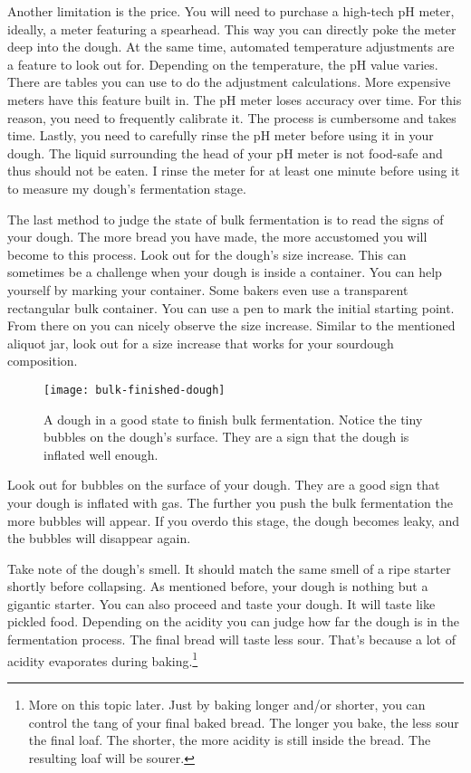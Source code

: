 Another limitation is the price. You will need to purchase
a high-tech pH meter, ideally, a meter featuring a spearhead.
This way you can directly poke the meter deep into the dough.
At the same time, automated temperature adjustments are a
feature to look out for. Depending on the temperature,
the pH value varies. There are tables you can use to
do the adjustment calculations. More expensive meters
have this feature built in. The pH meter loses accuracy
over time. For this reason, you need to frequently
calibrate it. The process is cumbersome and takes time.
Lastly, you need to carefully rinse the pH meter before
using it in your dough. The liquid surrounding the
head of your pH meter is not food-safe and thus should
not be eaten. I rinse the meter for at least one minute
before using it to measure my dough's fermentation stage.

The last method to judge the state of bulk fermentation
is to read the signs of your dough. The more bread you have
made, the more accustomed you will become to this process.
Look out for the dough's size increase. This can sometimes
be a challenge when your dough is inside a container.
You can help yourself by marking your container. Some bakers
even use a transparent rectangular bulk container. You
can use a pen to mark the initial starting point. From there
on you can nicely observe the size increase. Similar to the
mentioned aliquot jar, look out for a size increase that works
for your sourdough composition.

\begin{figure}[!htb]
  \texttt{[image: bulk-finished-dough]}
  \caption{A dough in a good state to finish bulk fermentation. Notice
  the tiny bubbles on the dough's surface. They are a sign that the dough
  is inflated well enough.}
\end{figure}

Look out for bubbles on the surface of your dough. They
are a good sign that your dough is inflated with gas. The
further you push the bulk fermentation the more bubbles
will appear. If you overdo this stage, the dough becomes leaky, and
the bubbles will disappear again.

Take note of the dough's smell. It should match the same
smell of a ripe starter shortly before collapsing. As mentioned
before, your dough is nothing but a gigantic starter. You
can also proceed and taste your dough. It will taste like
pickled food. Depending on the acidity you can judge how
far the dough is in the fermentation process. The final bread
will taste less sour. That's because a lot of acidity evaporates
during baking.\footnote{More on this topic later.
Just by baking longer and/or shorter, you can control
the tang of your final baked bread. The longer
you bake, the less sour the final loaf. The shorter,
the more acidity is still inside the bread. The resulting
loaf will be sourer.}

